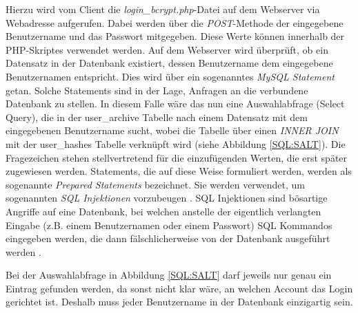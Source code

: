 \documentclass[../main.tex]{subfiles}
\begin{document}
	Hierzu wird vom Client die \emph{login\_bcrypt.php}-Datei auf dem Webserver via Webadresse aufgerufen. Dabei werden über die \emph{POST}-Methode der eingegebene Benutzername und das Passwort mitgegeben. Diese Werte können innerhalb der PHP-Skriptes verwendet werden. Auf dem Webserver wird überprüft, ob ein Datensatz in der Datenbank existiert, dessen Benutzername dem eingegebene Benutzernamen entspricht. Dies wird über ein sogenanntes \emph{MySQL Statement} getan. Solche Statements sind in der Lage, Anfragen an die verbundene Datenbank zu stellen. In diesem Falle wäre das nun eine Auswahlabfrage (Select Query), die in der user\_archive Tabelle nach einem Datensatz mit dem eingegebenen Benutzername sucht, wobei die Tabelle über einen \emph{INNER JOIN} mit der user\_hashes Tabelle verknüpft wird (siehe Abbildung \ref{SQL:SALT}). Die Fragezeichen stehen stellvertretend für die einzufügenden Werten, die erst später zugewiesen werden. Statements, die auf diese Weise formuliert werden, werden als sogenannte \emph{Prepared Statements} bezeichnet. Sie werden verwendet, um sogenannten \emph{SQL Injektionen} vorzubeugen \cite{preparedstatement}. SQL Injektionen sind bösartige Angriffe auf eine Datenbank, bei welchen anstelle der eigentlich verlangten Eingabe (z.B. einem Benutzernamen oder einem Passwort) SQL Kommandos eingegeben werden, die dann fälschlicherweise von der Datenbank ausgeführt werden \cite{sqlinjection}. 
	
	Bei der Auswahlabfrage in Abbildung \ref{SQL:SALT} darf jeweils nur genau ein Eintrag gefunden werden, da sonst nicht klar wäre, an welchen Account das Login gerichtet ist. Deshalb muss jeder Benutzername in der Datenbank einzigartig sein.
 
\end{document}
